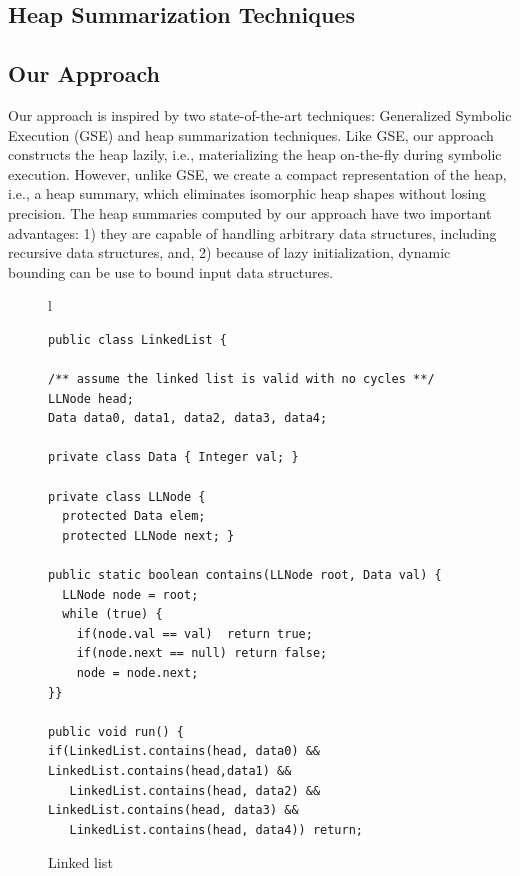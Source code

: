 \subsection{Heap Summarization Techniques}

\subsection{Our Approach}

Our approach is inspired by two state-of-the-art techniques: Generalized 
Symbolic Execution (GSE) and heap summarization techniques. Like GSE,
our approach constructs the heap lazily, i.e., materializing the heap
on-the-fly during symbolic execution. However, unlike GSE, we create
a compact representation of the heap, i.e., a heap summary, which eliminates
isomorphic heap shapes without losing precision. The heap summaries computed
by our approach have two important advantages: 1) they are capable of 
handling arbitrary data structures, including recursive data structures,
and, 2) because of lazy initialization, dynamic bounding can be use to
bound input data structures.

\begin{figure}
\begin{tabular}[c]{l}
\begin{lstlisting}
public class LinkedList {

/** assume the linked list is valid with no cycles **/
LLNode head;
Data data0, data1, data2, data3, data4;

private class Data { Integer val; }

private class LLNode {
  protected Data elem;
  protected LLNode next; }

public static boolean contains(LLNode root, Data val) {
  LLNode node = root;
  while (true) {
    if(node.val == val)  return true;
    if(node.next == null) return false;
    node = node.next;
}}

public void run() {
if(LinkedList.contains(head, data0) && LinkedList.contains(head,data1) &&
   LinkedList.contains(head, data2) && LinkedList.contains(head, data3) &&
   LinkedList.contains(head, data4)) return;
\end{lstlisting}
\end{tabular} 
\caption{Linked list}
\label{fig:example}
\end{figure}

